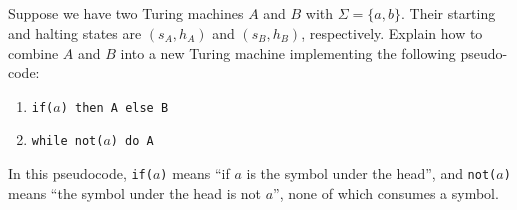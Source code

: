 \subsection{} %
Suppose we have two Turing machines \(A\) and \(B\)
with \(\Sigma = \{a, b\}\).
Their starting and halting states
are \((s_A, h_A)\) and \((s_B, h_B)\), respectively.
Explain how to combine \(A\) and \(B\) into a new Turing machine implementing
the following pseudo-code:
\begin{enumerate}
	\item \texttt{if($a$) then {A} else {B}}
	\item \texttt{while not($a$) do {A}}
\end{enumerate}
In this pseudocode, \texttt{if($a$)} means
``if $a$ is the symbol under the head'',
and \texttt{not($a$)} means ``the symbol under the head is not $a$'',
none of which consumes a symbol.

